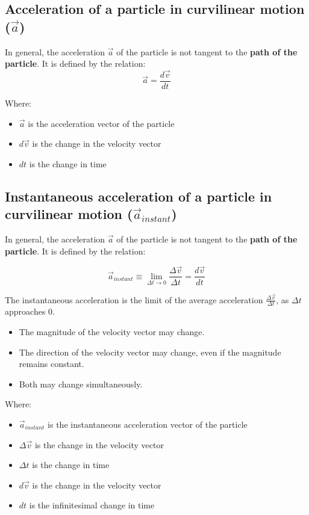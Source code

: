\documentclass[11pt]{article}
\begin{document}
\subsection{Acceleration of a particle in curvilinear motion (\(\vec{a}\))}
\label{sec:org1ac68be}
In general, the acceleration \(\vec{a}\) of the particle is not tangent to the \textbf{path of the particle}. It is defined by the relation:
\[\vec{a} = \frac{d \vec{v}}{dt}\]

Where:
\begin{itemize}
\item \(\vec{a}\) is the acceleration vector of the particle
\item \(d \vec{v}\) is the change in the velocity vector
\item \(dt\) is the change in time
\end{itemize}
\subsection{Instantaneous acceleration of a particle in curvilinear motion (\(\vec{a}_{instant}\))}
\label{sec:orgd378d94}
In general, the acceleration \(\vec{a}\) of the particle is not tangent to the \textbf{path of the particle}. It is defined by the relation:

\[\vec{a}_{instant} \equiv \lim_{\Delta t \rightarrow 0} \frac{\Delta \vec{v}}{\Delta t} = \frac{d \vec{v}}{dt}\]

The instantaneous acceleration is the limit of the average acceleration \(\frac{\Delta \vec{v}}{\Delta t}\), as \(\Delta t\) approaches 0.
\begin{itemize}
\item The magnitude of the velocity vector may change.
\item The direction of the velocity vector may change, even if the magnitude remains constant.
\item Both may change simultaneously.
\end{itemize}

Where:
\begin{itemize}
\item \(\vec{a}_{instant}\) is the instantaneous acceleration vector of the particle
\item \(\Delta \vec{v}\) is the change in the velocity vector
\item \(\Delta t\) is the change in time
\item \(d \vec{v}\) is the change in the velocity vector
\item \(dt\) is the infinitesimal change in time
\end{itemize}
\end{document}
